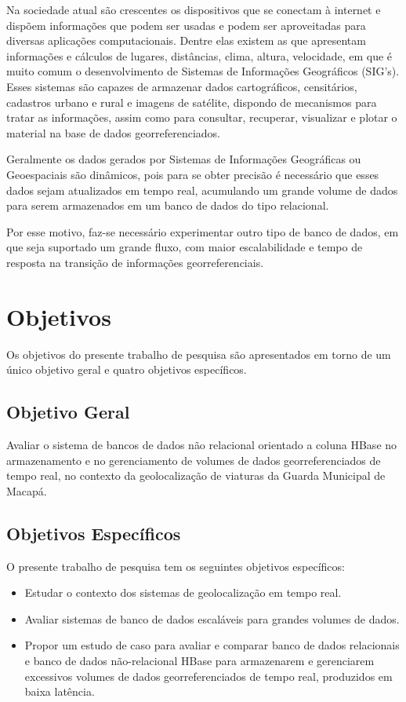 Na sociedade atual são crescentes os dispositivos que se conectam à internet e dispõem informações que podem ser usadas e podem ser aproveitadas para diversas aplicações computacionais\cite{Vega}. Dentre elas existem as que apresentam informações e cálculos de lugares, distâncias, clima, altura, velocidade, em que é muito comum o desenvolvimento de Sistemas de Informações Geográficos (SIG’s)\cite{Vega}. Esses sistemas são capazes de armazenar dados cartográficos, censitários, cadastros urbano e rural e imagens de satélite, dispondo de mecanismos para tratar as informações, assim como para consultar, recuperar, visualizar e plotar o material na base de dados georreferenciados\cite{Vega}.

Geralmente os dados gerados por Sistemas de Informações Geográficas ou Geoespaciais são dinâmicos, pois para se obter precisão é necessário que esses dados sejam atualizados em tempo real, acumulando um grande volume de dados para serem armazenados em um banco de dados do tipo relacional\cite{Prikh}.

Por esse motivo, faz-se necessário experimentar outro tipo de banco de dados, em que seja suportado um grande fluxo, com maior escalabilidade e tempo de resposta na transição de informações georreferenciais.

\section{Objetivos}
Os objetivos do presente trabalho de pesquisa são apresentados em torno de um único objetivo geral e quatro objetivos específicos.

\subsection{Objetivo Geral}

Avaliar o sistema de bancos de dados não relacional orientado a coluna HBase no armazenamento e no gerenciamento de volumes de dados georreferenciados de tempo real, no contexto da geolocalização de viaturas da Guarda Municipal de Macapá.

\subsection {Objetivos Específicos}

O presente trabalho de pesquisa tem os seguintes objetivos específicos:

\begin{itemize}
	\item Estudar o contexto dos sistemas de geolocalização em tempo real.
	\item Avaliar sistemas de banco de dados escaláveis para grandes volumes de dados.
	\item Propor um estudo de caso para avaliar e comparar banco de dados relacionais e banco de dados não-relacional HBase para armazenarem e gerenciarem excessivos volumes de dados georreferenciados de tempo real, produzidos em baixa latência.
	 
\end{itemize}

